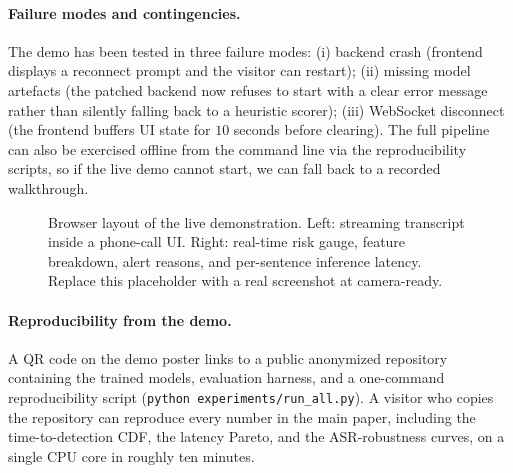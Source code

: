 \documentclass[11pt,a4paper]{article}
\begin{document}
\paragraph{Failure modes and contingencies.}
The demo has been tested in three failure modes: (i) backend crash
(frontend displays a reconnect prompt and the visitor can restart);
(ii) missing model artefacts (the patched backend now refuses to start
with a clear error message rather than silently falling back to a
heuristic scorer); (iii) WebSocket disconnect (the frontend buffers UI
state for $10$ seconds before clearing). The full pipeline can also
be exercised offline from the command line via the reproducibility
scripts, so if the live demo cannot start, we can fall back to a
recorded walkthrough.

\begin{figure}[ht]
\centering
{}
\caption{Browser layout of the live demonstration. Left: streaming
transcript inside a phone-call UI. Right: real-time risk gauge,
feature breakdown, alert reasons, and per-sentence inference
latency. Replace this placeholder with a real screenshot at
camera-ready.}
\label{fig:layout}
\end{figure}

\paragraph{Reproducibility from the demo.}
A QR code on the demo poster links to a public anonymized repository
containing the trained models, evaluation harness, and a one-command
reproducibility script (\texttt{python experiments/run\_all.py}). A
visitor who copies the repository can reproduce every number in the
main paper, including the time-to-detection CDF, the latency Pareto,
and the ASR-robustness curves, on a single CPU core in roughly ten
minutes.
\end{document}
